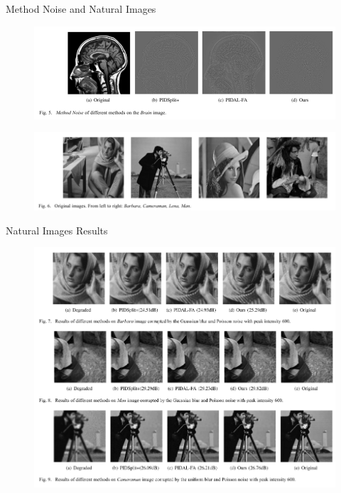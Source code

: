 \documentclass{beamer}
\begin{document}
\begin{frame}{Method Noise and Natural Images}

\begin{figure}
    \centering
    \includegraphics[scale=0.55]{result_brain1.png}
\end{figure}

\begin{figure}
    \centering
\includegraphics[scale=0.55]{result_naturalimages_original.png}
\end{figure}
\end{frame}

\begin{frame}{Natural Images Results}
    \begin{figure}
        \centering
        \includegraphics[scale=0.5]{result_naturalimages.png}
    \end{figure}
\end{frame}
\end{document}
